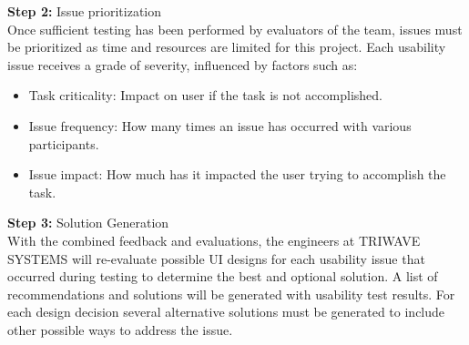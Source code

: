 \textbf{Step 2:} Issue prioritization\\
\medskip
Once sufficient testing has been performed by evaluators of the team, issues must be prioritized as time and resources are limited for this project. Each usability issue receives a grade of severity, influenced by factors such as:
\begin{itemize}
\setlength\itemsep{0.1mm}
	\item Task criticality: Impact on user if the task is not accomplished.
	\item Issue frequency: How many times an issue has occurred with various participants.
	\item Issue impact: How much has it impacted the user trying to accomplish the task.
\end{itemize}

\bigskip



\textbf{Step 3:} Solution Generation\\
\medskip
With the combined feedback and evaluations, the engineers at TRIWAVE SYSTEMS will re-evaluate possible UI designs for each usability issue that occurred during testing to determine the best and optional solution. A list of recommendations and solutions will be generated with usability test results. For each design decision several alternative solutions must be generated to include other possible ways to address the issue. 







